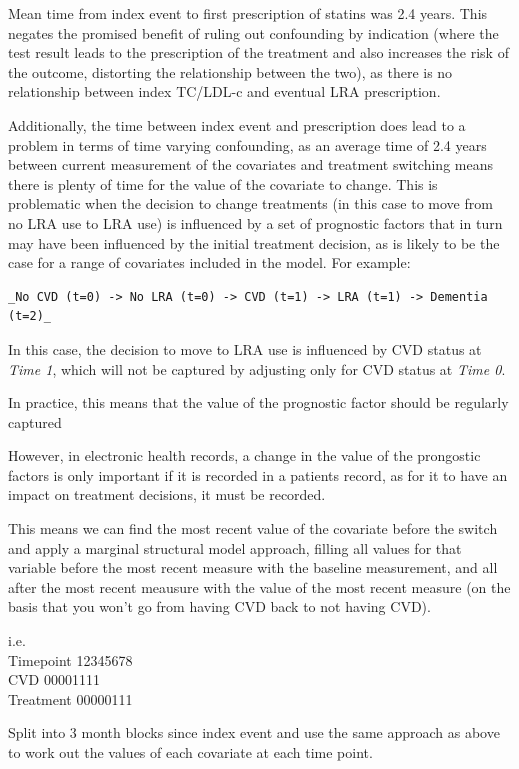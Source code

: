\documentclass[a4paper, twoside]{templates/ociamthesis}
\begin{document}
Mean time from index event to first prescription of statins was 2.4 years. This negates the promised benefit of ruling out confounding by indication (where the test result leads to the prescription of the treatment and also increases the risk of the outcome, distorting the relationship between the two), as there is no relationship between index TC/LDL-c and eventual LRA prescription.

Additionally, the time between index event and prescription does lead to a problem in terms of time varying confounding, as an average time of 2.4 years between current measurement of the covariates and treatment switching means there is plenty of time for the value of the covariate to change. This is problematic when the decision to change treatments (in this case to move from no LRA use to LRA use) is influenced by a set of prognostic factors that in turn may have been influenced by the initial treatment decision, as is likely to be the case for a range of covariates included in the model. For example:

\begin{verbatim}
_No CVD (t=0) -> No LRA (t=0) -> CVD (t=1) -> LRA (t=1) -> Dementia (t=2)_
\end{verbatim}

In this case, the decision to move to LRA use is influenced by CVD status at \emph{Time 1}, which will not be captured by adjusting only for CVD status at \emph{Time 0}.

In practice, this means that the value of the prognostic factor should be regularly captured

However, in electronic health records, a change in the value of the prongostic factors is only important if it is recorded in a patients record, as for it to have an impact on treatment decisions, it must be recorded.

This means we can find the most recent value of the covariate before the switch and apply a marginal structural model approach, filling all values for that variable before the most recent measure with the baseline measurement, and all after the most recent meausure with the value of the most recent measure (on the basis that you won't go from having CVD back to not having CVD).

i.e.\\
Timepoint 12345678\\
CVD 00001111\\
Treatment 00000111

Split into 3 month blocks since index event and use the same approach as above to work out the values of each covariate at each time point.
\end{document}
